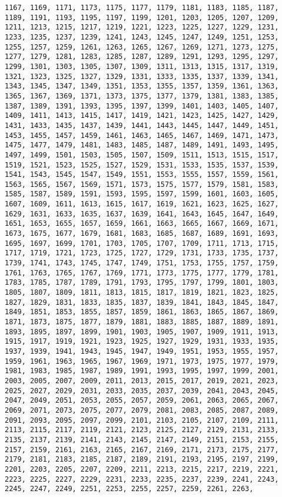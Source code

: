 \documentclass[11pt]{article}
\begin{document}
\begin{Verbatim}[commandchars=\\\{\}]
1167, 1169, 1171, 1173, 1175, 1177, 1179, 1181, 1183, 1185, 1187, 1189, 1191, 1193, 1195, 1197, 1199, 1201, 1203, 1205, 1207, 1209, 1211, 1213, 1215, 1217, 1219, 1221, 1223, 1225, 1227, 1229, 1231, 1233, 1235, 1237, 1239, 1241, 1243, 1245, 1247, 1249, 1251, 1253, 1255, 1257, 1259, 1261, 1263, 1265, 1267, 1269, 1271, 1273, 1275, 1277, 1279, 1281, 1283, 1285, 1287, 1289, 1291, 1293, 1295, 1297, 1299, 1301, 1303, 1305, 1307, 1309, 1311, 1313, 1315, 1317, 1319, 1321, 1323, 1325, 1327, 1329, 1331, 1333, 1335, 1337, 1339, 1341, 1343, 1345, 1347, 1349, 1351, 1353, 1355, 1357, 1359, 1361, 1363, 1365, 1367, 1369, 1371, 1373, 1375, 1377, 1379, 1381, 1383, 1385, 1387, 1389, 1391, 1393, 1395, 1397, 1399, 1401, 1403, 1405, 1407, 1409, 1411, 1413, 1415, 1417, 1419, 1421, 1423, 1425, 1427, 1429, 1431, 1433, 1435, 1437, 1439, 1441, 1443, 1445, 1447, 1449, 1451, 1453, 1455, 1457, 1459, 1461, 1463, 1465, 1467, 1469, 1471, 1473, 1475, 1477, 1479, 1481, 1483, 1485, 1487, 1489, 1491, 1493, 1495, 1497, 1499, 1501, 1503, 1505, 1507, 1509, 1511, 1513, 1515, 1517, 1519, 1521, 1523, 1525, 1527, 1529, 1531, 1533, 1535, 1537, 1539, 1541, 1543, 1545, 1547, 1549, 1551, 1553, 1555, 1557, 1559, 1561, 1563, 1565, 1567, 1569, 1571, 1573, 1575, 1577, 1579, 1581, 1583, 1585, 1587, 1589, 1591, 1593, 1595, 1597, 1599, 1601, 1603, 1605, 1607, 1609, 1611, 1613, 1615, 1617, 1619, 1621, 1623, 1625, 1627, 1629, 1631, 1633, 1635, 1637, 1639, 1641, 1643, 1645, 1647, 1649, 1651, 1653, 1655, 1657, 1659, 1661, 1663, 1665, 1667, 1669, 1671, 1673, 1675, 1677, 1679, 1681, 1683, 1685, 1687, 1689, 1691, 1693, 1695, 1697, 1699, 1701, 1703, 1705, 1707, 1709, 1711, 1713, 1715, 1717, 1719, 1721, 1723, 1725, 1727, 1729, 1731, 1733, 1735, 1737, 1739, 1741, 1743, 1745, 1747, 1749, 1751, 1753, 1755, 1757, 1759, 1761, 1763, 1765, 1767, 1769, 1771, 1773, 1775, 1777, 1779, 1781, 1783, 1785, 1787, 1789, 1791, 1793, 1795, 1797, 1799, 1801, 1803, 1805, 1807, 1809, 1811, 1813, 1815, 1817, 1819, 1821, 1823, 1825, 1827, 1829, 1831, 1833, 1835, 1837, 1839, 1841, 1843, 1845, 1847, 1849, 1851, 1853, 1855, 1857, 1859, 1861, 1863, 1865, 1867, 1869, 1871, 1873, 1875, 1877, 1879, 1881, 1883, 1885, 1887, 1889, 1891, 1893, 1895, 1897, 1899, 1901, 1903, 1905, 1907, 1909, 1911, 1913, 1915, 1917, 1919, 1921, 1923, 1925, 1927, 1929, 1931, 1933, 1935, 1937, 1939, 1941, 1943, 1945, 1947, 1949, 1951, 1953, 1955, 1957, 1959, 1961, 1963, 1965, 1967, 1969, 1971, 1973, 1975, 1977, 1979, 1981, 1983, 1985, 1987, 1989, 1991, 1993, 1995, 1997, 1999, 2001, 2003, 2005, 2007, 2009, 2011, 2013, 2015, 2017, 2019, 2021, 2023, 2025, 2027, 2029, 2031, 2033, 2035, 2037, 2039, 2041, 2043, 2045, 2047, 2049, 2051, 2053, 2055, 2057, 2059, 2061, 2063, 2065, 2067, 2069, 2071, 2073, 2075, 2077, 2079, 2081, 2083, 2085, 2087, 2089, 2091, 2093, 2095, 2097, 2099, 2101, 2103, 2105, 2107, 2109, 2111, 2113, 2115, 2117, 2119, 2121, 2123, 2125, 2127, 2129, 2131, 2133, 2135, 2137, 2139, 2141, 2143, 2145, 2147, 2149, 2151, 2153, 2155, 2157, 2159, 2161, 2163, 2165, 2167, 2169, 2171, 2173, 2175, 2177, 2179, 2181, 2183, 2185, 2187, 2189, 2191, 2193, 2195, 2197, 2199, 2201, 2203, 2205, 2207, 2209, 2211, 2213, 2215, 2217, 2219, 2221, 2223, 2225, 2227, 2229, 2231, 2233, 2235, 2237, 2239, 2241, 2243, 2245, 2247, 2249, 2251, 2253, 2255, 2257, 2259, 2261, 2263, 
\end{Verbatim}
\end{document}
